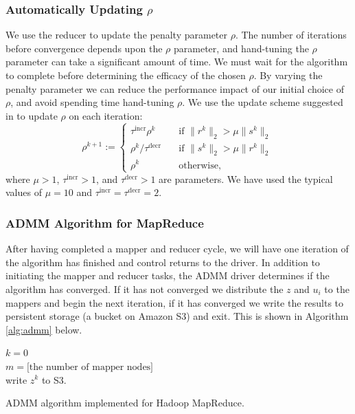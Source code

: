 \documentclass[10pt, conference, compsocconf]{IEEEtran}
\begin{document}
\subsubsection{Automatically Updating $\rho$}

We use the reducer to update the penalty parameter $\rho$.  The number of iterations before convergence depends upon the $\rho$ parameter, and hand-tuning the $\rho$ parameter can take a significant amount of time.  We must wait for the algorithm to complete before determining the efficacy of the chosen $\rho$.  By varying the penalty parameter we can reduce the performance impact of our initial choice of $\rho$, and avoid spending time hand-tuning $\rho$.  We use the update scheme suggested in \cite{boyd} to update $\rho$ on each iteration:
\begin{equation}
\rho^{k+1}:=\begin{cases}
  \tau^{\text{incr}}\rho^k&\quad \text{if $\|r^k\|_2>\mu\|s^k\|_2$}\\
  \rho^k/\tau^{\text{decr}}&\quad \text{if $\|s^k\|_2>\mu\|r^k\|_2$}\\
  \rho^k&\quad \text{otherwise,}
\end{cases}
\label{eq:r}
\end{equation}
where $\mu>1$, $\tau^{\text{incr}}>1$, and $\tau^{\text{decr}}>1$ are parameters.  We have used the typical values of $\mu=10$ and $\tau^{\text{incr}}=\tau^{\text{decr}}=2$.

\subsubsection{ADMM Algorithm for MapReduce}
After having completed a mapper and reducer cycle, we will have one iteration of the algorithm has finished and control returns to the driver.  In addition to initiating the mapper and reducer tasks, the ADMM driver determines if the algorithm has converged.  If it has not converged we distribute the $z$ and $u_i$ to the mappers and begin the next iteration, if it has converged we write the results to persistent storage (a bucket on Amazon S3) and exit.  This is shown in Algorithm \ref{alg:admm} below.

\begin{algorithm}
\SetAlgoLined
{}
$k=0$\\
$m=\text{[the number of mapper nodes]}$\\
write $z^k$ to S3.
\label{alg:admm}
\vspace{1em}
\caption{ADMM algorithm implemented for Hadoop MapReduce.}
\end{algorithm}
\end{document}
